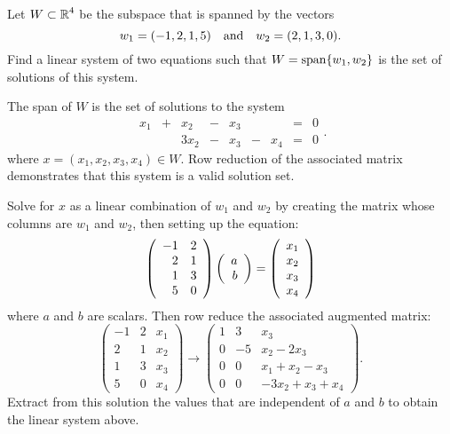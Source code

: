 \documentclass{ximera}
\begin{document}
\begin{exercise} \label{c5.2.7}
Let $W\subset\mbox{$\Bbb{R}$}^4$ be the subspace that is spanned by the vectors
\[
        w_1=(-1,2,1,5)\quad\mbox{and}\quad w_2=(2,1,3,0).
\]
Find a linear system of two equations such that
$W={\rm span}\{w_1,w_2\}$ is the set of solutions of this system.

\begin{solution}

\ans The span of $W$ is the set of solutions to the system
\[ 
\begin{array}{rrrrrrrrr}
x_1 & + & x_2 & - & x_3 & & & = & 0 \\
& & 3x_2 & - & x_3 & - & x_4 & = & 0 \end{array}. 
\]
where $x = (x_1,x_2,x_3,x_4) \in W$.  Row reduction of the associated
matrix demonstrates that this system is a valid solution set.

\soln Solve for $x$ as a linear combination of $w_1$ and $w_2$
by creating the matrix whose columns are $w_1$ and $w_2$,
then setting up the equation:
\[ 
\left(\begin{array}{rr} -1 & 2 \\ 2 & 1 \\ 1 & 3 \\ 5 & 0 
\end{array}\right) \left(\begin{array}{r} a \\ b\end{array}\right) = \left(\begin{array}{r} x_1 \\
x_2 \\ x_3 \\ x_4 \end{array}\right) 
\]
where $a$ and $b$ are scalars.  Then row reduce the associated
augmented matrix:
\[ 
\left(\begin{array}{rr|r} -1 & 2 & x_1 \\ 2 & 1 & x_2 \\ 1 & 3
& x_3 \\ 5 & 0 & x_4 \end{array}\right) \longrightarrow
\left(\begin{array}{rr|l} 1 & 3 & x_3 \\ 0 & -5 & x_2 - 2x_3 \\
0 & 0 & x_1 + x_2 - x_3 \\ 0 & 0 & -3x_2 + x_3 + x_4
\end{array}\right). 
\]
Extract from this solution the values that are independent of $a$
and $b$ to obtain the linear system above.


\end{solution}
\end{exercise}
\end{document}
